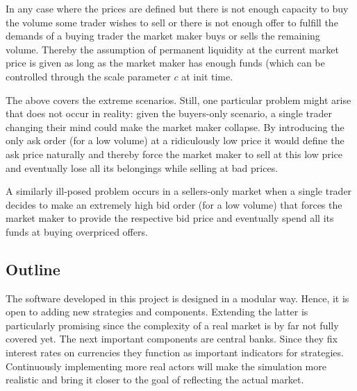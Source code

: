 In any case where the prices are defined but there is not enough capacity to buy the
volume some trader wishes to sell or there is not enough offer to fulfill the demands
of a buying trader the market maker buys or sells the remaining volume. Thereby the
assumption of permanent liquidity at the current market price is given as long as the
market maker has enough funds (which can be controlled through the scale parameter $c$
at init time.

The above covers the extreme scenarios. Still, one particular problem might arise that
does not occur in reality: given the buyers-only scenario, a single trader changing
their mind could make the market maker collapse. By introducing the only ask order (for a low volume) at 
a ridiculously low price it would define the ask price naturally and thereby force
the market maker to sell at this low price and eventually lose all its belongings
while selling at bad prices.

A similarly ill-posed problem occurs in a sellers-only market when a single trader
decides to make an extremely high bid order (for a low volume) that forces the market
maker to provide the respective bid price and eventually spend all its funds at buying
overpriced offers.

\subsection{Outline}
The software developed in this project is designed in a modular way. Hence, it is open
to adding new strategies and components. Extending the latter is particularly 
promising since the complexity of a real market is by far not fully covered yet. The next
important components are central banks. Since they fix interest rates on currencies 
they function as important indicators for strategies. Continuously implementing more
real actors will make the simulation more realistic and bring it closer to the goal 
of reflecting the actual market.


